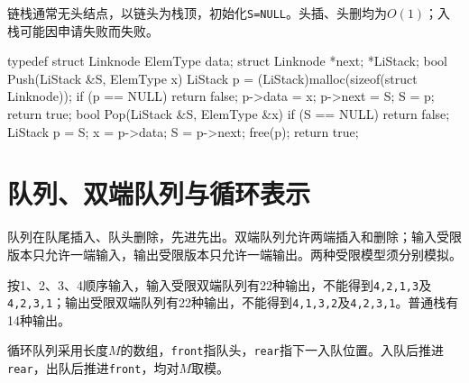 链栈通常无头结点，以链头为栈顶，初始化\texttt{S=\allowbreak{}NULL}。头插、头删均为\(O(1)\)；入栈可能因申请失败而失败。

\par\smallskip\noindent\begin{minipage}{\linewidth}
\begin{codeblock}[language={C++}]
typedef struct Linknode {
    ElemType data;
    struct Linknode *next;
} *LiStack;
bool Push(LiStack &S, ElemType x) {
    LiStack p = (LiStack)malloc(sizeof(struct Linknode));
    if (p == NULL) return false;
    p->data = x;
    p->next = S;
    S = p;
    return true;
}
bool Pop(LiStack &S, ElemType &x) {
    if (S == NULL) return false;
    LiStack p = S;
    x = p->data;
    S = p->next;
    free(p);
    return true;
}
\end{codeblock}
\end{minipage}\par\smallskip

\section{队列、双端队列与循环表示}\label{DS03-queue}

队列在队尾插入、队头删除，先进先出。双端队列允许两端插入和删除；输入受限版本只允许一端输入，输出受限版本只允许一端输出。两种受限模型须分别模拟。

按1、2、3、4顺序输入，输入受限双端队列有22种输出，不能得到\texttt{4,\allowbreak{}2,\allowbreak{}1,\allowbreak{}3}及\texttt{4,\allowbreak{}2,\allowbreak{}3,\allowbreak{}1}；输出受限双端队列有22种输出，不能得到\texttt{4,\allowbreak{}1,\allowbreak{}3,\allowbreak{}2}及\texttt{4,\allowbreak{}2,\allowbreak{}3,\allowbreak{}1}。普通栈有14种输出。

循环队列采用长度\(M\)的数组，\texttt{front}指队头，\texttt{rear}指下一入队位置。入队后推进\texttt{rear}，出队后推进\texttt{front}，均对\(M\)取模。

